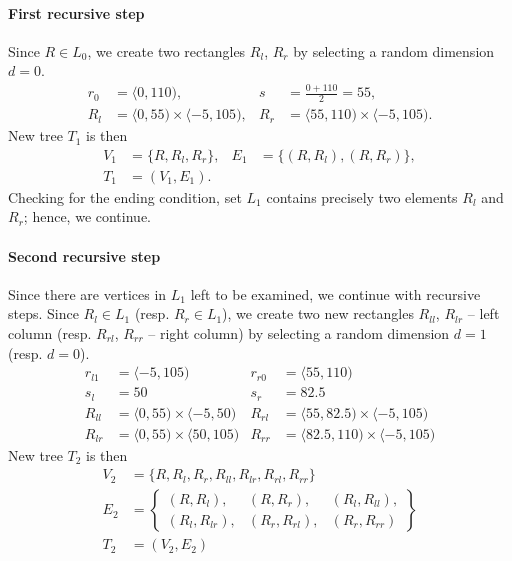 \paragraph{First recursive step}
     Since $R \in L_0$, we create two rectangles $R_l$, $R_r$ by selecting a random dimension $d=0$.
    \begin{align*}
        r_0 &= \langle 0, 110), &
        s &= \frac{0 + 110}{2} = 55, \\
        R_l &= \langle 0, 55) \times \langle -5,105), &
        R_r &= \langle 55, 110) \times \langle -5,105).
    \end{align*}
     New tree $T_1$ is then
    \begin{align*}
    V_1 &= \{R, R_l, R_r\}, &
    E_1 &= \{(R, R_l), (R, R_r)\}, \\
    T_1 &= (V_1, E_1).
    \end{align*}
    Checking for the ending condition, set $L_1$ contains precisely two elements $R_l$ and $R_r$; hence, we continue.
     
\paragraph{Second recursive step}
    Since there are vertices in $L_1$ left to be examined, we continue with recursive steps.
    Since $R_l \in L_1$ (resp. $R_r \in L_1$), we create two new rectangles $R_{ll}$, $R_{lr}$ -- left column (resp. $R_{rl}$, $R_{rr}$ -- right column) by selecting a random dimension $d=1$ (resp. $d=0$).
    \begin{align*}
        r_{l1} &= \langle -5, 105)& r_{r0} &= \langle 55, 110) \\
        s_l &= 50 & s_r&=82.5\\
        R_{ll} &= \langle 0, 55) \times \langle -5,50) & R_{rl} &= \langle 55, 82.5) \times \langle -5,105)\\
        R_{lr} &= \langle 0, 55) \times \langle 50,105) & R_{rr} &= \langle 82.5, 110) \times \langle -5,105)
    \end{align*}
 New tree $T_2$ is then
    \begin{align*}
        V_2 &= \{R, R_l, R_r, R_{ll}, R_{lr}, R_{rl}, R_{rr}\} \\
        E_2 &= \left\{\begin{smallmatrix}
        (R, R_l), &(R, R_r), &(R_l, R_{ll}),\\
        (R_l, R_{lr}),& (R_r, R_{rl}),& (R_r, R_{rr})
        \end{smallmatrix}\right\} \\
        T_2 &= (V_2, E_2)
    \end{align*}
